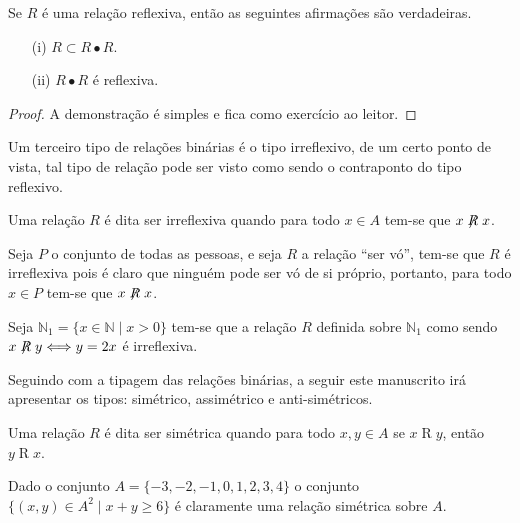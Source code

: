 \begin{theorem}
	Se $R$ é uma relação reflexiva, então as seguintes afirmações são verdadeiras.
	\begin{itemize}
		\item[(i)] $R \subset R \bullet R$.
		\item[(ii)] $R \bullet R$ é reflexiva.
	\end{itemize}
\end{theorem}

\begin{proof}
	A demonstração é simples e fica como exercício ao leitor.
\end{proof}

Um terceiro tipo de relações binárias é o tipo irreflexivo, de um certo ponto de vista, tal tipo de relação pode ser visto como sendo o contraponto do tipo reflexivo.

\begin{definition}\label{def:RelacaoIrreflexiva}
	Uma relação $R$ é dita ser irreflexiva quando para todo $x \in A$ tem-se que $x \centernot{R} x$.
\end{definition}

\begin{example}
	Seja $P$ o conjunto de todas as pessoas, e seja $R$ a relação ``ser vó'', tem-se que $R$ é irreflexiva pois é claro que ninguém pode ser vó de si próprio, portanto, para todo $x \in P$ tem-se que $x \centernot{R} x$.
\end{example}

\begin{example}
	Seja $\mathbb{N}_1 = \{x \in \mathbb{N} \mid x > 0\}$ tem-se que a relação $R$ definida sobre $\mathbb{N}_1$ como sendo $x \centernot{R} y \Longleftrightarrow y = 2x$ é irreflexiva.
\end{example}

Seguindo com a tipagem das relações binárias,  a seguir este manuscrito irá apresentar os tipos: simétrico, assimétrico e anti-simétricos.

\begin{definition}\label{def:RelacaoSimétrica}
	Uma relação $R$ é dita ser simétrica quando para todo $x, y \in A$ se $x \mathrel{R} y$, então $y \mathrel{R} x$.
\end{definition}

\begin{example}
	Dado o conjunto $A = \{-3, -2, -1, 0, 1, 2, 3, 4\}$ o conjunto $\{(x, y) \in A^2 \mid x + y \geq 6\}$ é claramente uma relação simétrica sobre $A$.
\end{example}

